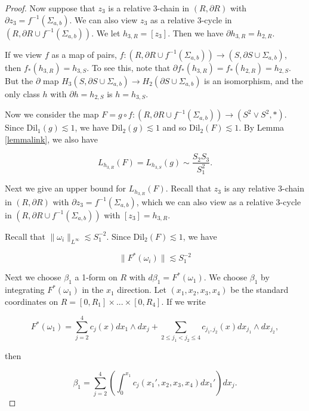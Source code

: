 \documentclass{amsart}
\newtheorem*{theorem 1}{Theorem 1}
\newtheorem*{theorem 2}{Theorem 2}
\newtheorem*{theorem 3}{Theorem 3}
\numberwithin{equation}{section}
\newcommand{\Dil}{\textrm{Dil}}
\begin{document}
\begin{proof}
Now suppose that $z_3$ is a relative 3-chain in $(R,  \partial R)$ with $\partial z_3 = f^{-1}(\Sigma_{a,b})$.   We can also view $z_3$ as a relative 3-cycle in $(R,  \partial R \cup f^{-1}(\Sigma_{a,b}))$.   We let $h_{3,R} = [z_3]$.   Then we have $\partial h_{3,R} = h_{2,R}$.   

If we view $f$ as a map of pairs,  $f: (R,  \partial R \cup f^{-1} (\Sigma_{a,b})) \rightarrow (S,  \partial S \cup \Sigma_{a,b})$,  then $f_*(h_{3,R}) = h_{3,S}$.   To see this,  note that  $\partial f_*(h_{3,R}) = f_*(h_{2,R}) = h_{2, S}.  $   But the $\partial$ map $H_3(S,  \partial S \cup \Sigma_{a,b}) \rightarrow H_2(\partial S \cup \Sigma_{a,b})$ is an isomorphism,  and the only class $h$ with $\partial h = h_{2,S}$ is $h = h_{3,S}$.   

Now we consider the map $F = g \circ f: (R, \partial R \cup f^{-1}(\Sigma_{a,b}))  \rightarrow (S^2 \vee S^2, *)$.   Since $\Dil_1(g) \lesssim 1$,  we have $\Dil_2(g) \lesssim 1$ and so $\Dil_2( F) \lesssim 1$.   By Lemma \ref{lemmalink},  we also have

\begin{equation} \label{linkF} L_{h_{3,R}}(F) = L_{h_{3,S}}(g) \sim \frac{ S_2 S_3}{S_1^2}.  \end{equation}

Next we give an upper bound for $L_{h_{3,R}}(F)$.   Recall that $z_3$ is any relative 3-chain in $(R,  \partial R)$ with $\partial z_3 = f^{-1}(\Sigma_{a,b})$,  which we can also view as a relative  3-cycle in $(R,   \partial R \cup f^{-1}(\Sigma_{a,b}))$ with $[z_3] = h_{3, R}$.   

Recall that $\| \omega_i \|_{L^\infty} \lesssim S_1^{-2}$.   Since $\Dil_2(F) \lesssim 1$,  we have

\begin{equation}
\| F^* (\omega_i) \| \lesssim S_1^{-2}
\end{equation}

Next we choose $\beta_1$ a 1-form on $R$ with $d \beta_1 = F^*(\omega_1)$.    We choose $\beta_1$ by integrating $F^*(\omega_1)$ in the $x_1$ direction.   Let $(x_1, x_2, x_3, x_4)$ be the standard coordinates on $R = [0,R_1] \times ... \times [0, R_4]$.   If we write 

$$F^*(\omega_1) = \sum_{j =2}^4 c_j(x) dx_1 \wedge dx_j + \sum_{2 \le j_1 < j_2 \le 4} c_{j_1, j_2}(x) d x_{j_1} \wedge d x_{j_2}, $$

then

$$ \beta_1 = \sum_{j=2}^4 \left( \int_{0}^{x_1} c_j(x_1',  x_2,  x_3, x_4) dx_1' \right) dx_j. $$


\end{proof}
\end{document}
